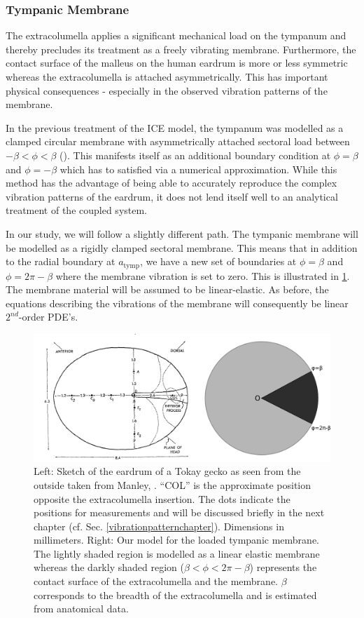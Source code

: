 \subsubsection{Tympanic Membrane}\label{tympanicmembrane}
The extracolumella applies a significant 
mechanical load on the tympanum and thereby precludes its treatment as a freely vibrating membrane. 
Furthermore, the contact surface of the malleus on the human eardrum is more or less symmetric whereas the 
extracolumella is attached asymmetrically. This has important physical consequences - especially in the 
observed vibration patterns of the membrane.

In the previous treatment of the ICE model, the tympanum was modelled as a clamped circular membrane with asymmetrically
attached sectoral load between $-\beta<\phi<\beta$ (\cite{vossenjasa}). This manifests itself as an additional
boundary condition at $\phi=\beta$ and $\phi=-\beta$ which has to satisfied via a numerical approximation. While
this method has the advantage of being able to accurately reproduce the complex vibration patterns of the eardrum, 
it does not lend itself well to an analytical treatment of the coupled system.

In our study, we will follow a slightly different path. The tympanic membrane will be modelled as a 
rigidly clamped sectoral membrane. This means that in addition to the radial boundary at $a_{\mathrm{tymp}}$,
we have a new set of boundaries at $\phi=\beta$ and $\phi=2\pi-\beta$ where the membrane vibration is set to zero. This is illustrated in \ref{tympanummodel}.
The membrane material will be assumed to be linear-elastic. As before, the equations describing the vibrations of the membrane will 
consequently be linear $2^{nd}$-order PDE's.
\begin{figure}[ht]
 \centering
 \includegraphics[width=.9\linewidth]{Diagrams/extracolumella2.png}
 \caption[Tympanic membrane model]{Left: Sketch of the eardrum of a Tokay gecko as seen from the outside taken from Manley, \cite{manleygecko1}. ``COL'' is
 the approximate position opposite the extracolumella insertion. The dots indicate the positions for measurements and will be discussed briefly in the
 next chapter (cf. Sec. \ref{vibrationpatternchapter}). Dimensions
 in millimeters. Right: Our model for the loaded tympanic membrane. The lightly shaded region is modelled as a linear elastic membrane whereas the darkly shaded region 
 ($\beta<\phi<2\pi-\beta$) represents the contact surface of the extracolumella and the membrane. $\beta$ corresponds to the breadth of the extracolumella and is estimated from anatomical data.}
 \label{tympanummodel}
\end{figure}

